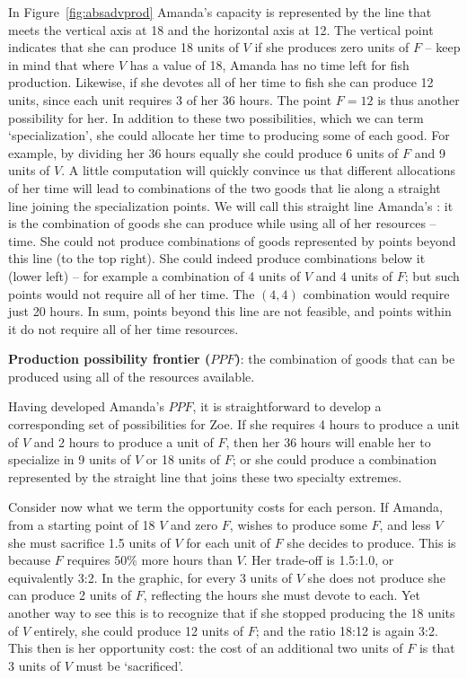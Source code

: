 In Figure~\ref{fig:absadvprod} Amanda's capacity is represented by the line that meets the vertical axis at 18 and the horizontal axis at 12. The vertical point indicates that she can produce 18 units of $V$ if she produces zero units of $F$ -- keep in mind that where $V$ has a value of 18, Amanda has no time left for fish production. Likewise, if she devotes all of her time to fish she can produce 12 units, since each unit requires 3 of her 36 hours. The point $F = 12$ is thus another possibility for her. In addition to these two possibilities, which we can term `specialization', she could allocate her time to producing some of each good. For example, by dividing her 36 hours equally she could produce 6 units of $F$ and 9 units of $V$. A little computation will quickly convince us that different allocations of her time will lead to combinations of the two goods that lie along a straight line joining the specialization points. We will call this straight line Amanda's : it is the combination of goods she can produce while using all of her resources -- time. She could not produce combinations of goods represented by points beyond this line (to the top right). She could indeed produce combinations below it (lower left) -- for example a combination of 4 units of $V$ and 4 units of $F$; but such points would not require all of her time. The $(4,4)$ combination would require just 20 hours. In sum, points beyond this line are not feasible, and points within it do not require all of her time resources. 

\begin{DefBox}
\textbf{Production possibility frontier ($PPF$)}: the combination of goods that can be produced using all of the resources available.
\end{DefBox}

Having developed Amanda's $PPF$, it is straightforward to develop a corresponding set of possibilities for Zoe. If she requires 4 hours to produce a unit of $V$ and 2 hours to produce a unit of $F$, then her 36 hours will enable her to specialize in 9 units of $V$ or 18 units of $F$; or she could produce a combination represented by the straight line that joins these two specialty extremes.

Consider now what we term the opportunity costs for each person. If Amanda, from a starting point of 18 $V$ and zero $F$, wishes to produce some $F$, and less $V$ she must sacrifice 1.5 units of $V$ for each unit of $F$ she decides to produce. This is because $F$ requires 50\% more hours than $V$. Her trade-off is 1.5:1.0, or equivalently 3:2. In the graphic, for every 3 units of $V$ she does not produce she can produce 2 units of $F$, reflecting the hours she must devote to each. Yet another way to see this is to recognize that if she stopped producing the 18 units of $V$ entirely, she could produce 12 units of $F$; and the ratio 18:12 is again 3:2. This then is her opportunity cost: the cost of an additional two units of $F$ is that 3 units of $V$ must be `sacrificed'.

